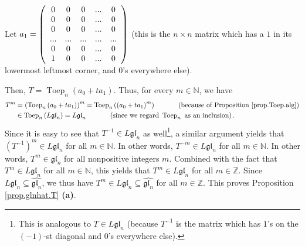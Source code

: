 \documentclass[etingof-lie.tex]{subfiles}
\begin{document}
Let $a_{1}=\left(
\begin{array}
[c]{ccccc}%
0 & 0 & 0 & ... & 0\\
0 & 0 & 0 & ... & 0\\
0 & 0 & 0 & ... & 0\\
... & ... & ... & ... & ...\\
0 & 0 & 0 & ... & 0\\
1 & 0 & 0 & ... & 0
\end{array}
\right)  $ (this is the $n\times n$ matrix which has a $1$ in its lowermost
leftmost corner, and $0$'s everywhere else).

Then, $T=\operatorname*{Toep}\nolimits_{n}\left(  a_{0}+ta_{1}\right)  $.
Thus, for every $m\in\mathbb{N}$, we have%
\begin{align*}
T^{m}  &  =\left(  \operatorname*{Toep}\nolimits_{n}\left(  a_{0}%
+ta_{1}\right)  \right)  ^{m}=\operatorname*{Toep}\nolimits_{n}\left(  \left(
a_{0}+ta_{1}\right)  ^{m}\right)  \ \ \ \ \ \ \ \ \ \ \left(  \text{because of
Proposition \ref{prop.Toep.alg}}\right) \\
&  \in\operatorname*{Toep}\nolimits_{n}\left(  L\mathfrak{gl}_{n}\right)
=L\mathfrak{gl}_{n}\ \ \ \ \ \ \ \ \ \ \left(  \text{since we regard
}\operatorname*{Toep}\nolimits_{n}\text{ as an inclusion}\right)  .
\end{align*}
Since it is easy to see that $T^{-1}\in L\mathfrak{gl}_{n}$ as
well\footnote{This is analogous to $T\in L\mathfrak{gl}_{n}$ (because $T^{-1}$
is the matrix which has $1$'s on the $\left(  -1\right)  $-st diagonal and
$0$'s everywhere else).}, a similar argument yields that $\left(
T^{-1}\right)  ^{m}\in L\mathfrak{gl}_{n}$ for all $m\in\mathbb{N}$. In other
words, $T^{-m}\in L\mathfrak{gl}_{n}$ for all $m\in\mathbb{N}$. In other
words, $T^{m}\in\mathfrak{gl}_{n}$ for all nonpositive integers $m$. Combined
with the fact that $T^{m}\in L\mathfrak{gl}_{n}$ for all $m\in\mathbb{N}$,
this yields that $T^{m}\in L\mathfrak{gl}_{n}$ for all $m\in\mathbb{Z}$. Since
$L\mathfrak{gl}_{n}\subseteq\widehat{\mathfrak{gl}_{n}}$, we thus have
$T^{m}\in L\mathfrak{gl}_{n}\subseteq\widehat{\mathfrak{gl}_{n}}$ for all
$m\in\mathbb{Z}$. This proves Proposition \ref{prop.glnhat.T} \textbf{(a)}.
\end{document}
